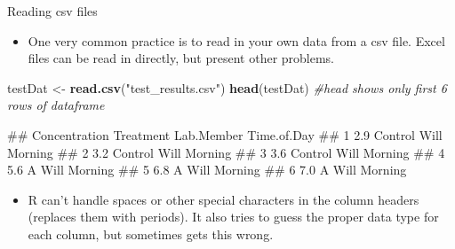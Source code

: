 \documentclass[
  ignorenonframetext,
  aspectratio=169]{beamer}
\newenvironment{Shaded}{\begin{snugshade}}{\end{snugshade}}
\newcommand{\CommentTok}[1]{\textcolor[rgb]{0.56,0.35,0.01}{\textit{#1}}}
\newcommand{\FunctionTok}[1]{\textcolor[rgb]{0.13,0.29,0.53}{\textbf{#1}}}
\newcommand{\NormalTok}[1]{#1}
\newcommand{\OtherTok}[1]{\textcolor[rgb]{0.56,0.35,0.01}{#1}}
\newcommand{\StringTok}[1]{\textcolor[rgb]{0.31,0.60,0.02}{#1}}
\providecommand{\tightlist}{%
  \setlength{\itemsep}{0pt}\setlength{\parskip}{0pt}}
\let\oldShaded\Shaded %
\let\endoldShaded\endShaded
\renewenvironment{Shaded}{\footnotesize\oldShaded}{\endoldShaded}
\let\oldverbatim\verbatim %Change fontsize of code chunk output
\let\endoldverbatim\endverbatim
\renewenvironment{verbatim}{\footnotesize\oldverbatim}{\endoldverbatim}
\begin{document}
\begin{frame}[fragile]{Reading csv files}
\protect\hypertarget{reading-csv-files}{}
\begin{itemize}[<+->]
\tightlist
\item
  One very common practice is to read in your own data from a csv file.
  Excel files can be read in directly, but present other problems.
\end{itemize}

\begin{Shaded}
\begin{Highlighting}[]
\NormalTok{testDat }\OtherTok{\textless{}{-}} \FunctionTok{read.csv}\NormalTok{(}\StringTok{"test\_results.csv"}\NormalTok{)}
\FunctionTok{head}\NormalTok{(testDat)  }\CommentTok{\#head shows only first 6 rows of dataframe}
\end{Highlighting}
\end{Shaded}

\begin{verbatim}
##   Concentration Treatment Lab.Member Time.of.Day
## 1           2.9   Control       Will     Morning
## 2           3.2   Control       Will     Morning
## 3           3.6   Control       Will     Morning
## 4           5.6         A       Will     Morning
## 5           6.8         A       Will     Morning
## 6           7.0         A       Will     Morning
\end{verbatim}

\begin{itemize}[<+->]
\tightlist
\item
  R can't handle spaces or other special characters in the column
  headers (replaces them with periods). It also tries to guess the
  proper data type for each column, but sometimes gets this wrong.
\end{itemize}
\end{frame}
\end{document}

